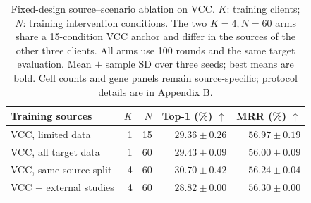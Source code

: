 \begin{table}[t]
\centering
\small
\setlength{\tabcolsep}{5pt}
\caption{Fixed-design source--scenario ablation on VCC. $K$: training clients; $N$: training intervention conditions. The two $K=4,N=60$ arms share a 15-condition VCC anchor and differ in the sources of the other three clients. All arms use 100 rounds and the same target evaluation. Mean $\pm$ sample SD over three seeds; best means are bold. Cell counts and gene panels remain source-specific; protocol details are in Appendix B.}
\label{tab:scenario-labs-matched}
\begin{tabular}{lrrrr}
\toprule
Training sources & $K$ & $N$ & Top-1 (\%) $\uparrow$ & MRR (\%) $\uparrow$ \\
\midrule
VCC, limited data & 1 & 15 & $29.36\pm0.26$ & $\mathbf{56.97\pm0.19}$ \\
VCC, all target data & 1 & 60 & $29.43\pm0.09$ & $56.00\pm0.09$ \\
VCC, same-source split & 4 & 60 & $\mathbf{30.70\pm0.42}$ & $56.24\pm0.04$ \\
VCC + external studies & 4 & 60 & $28.82\pm0.00$ & $56.30\pm0.00$ \\
\bottomrule
\end{tabular}
\end{table}
